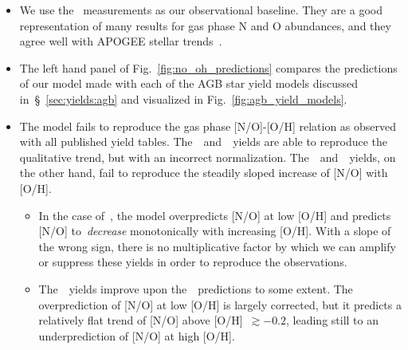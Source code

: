 \documentclass[ms.tex]{subfiles}
\begin{document}
\begin{itemize} 
	\item We use the~\citet{Dopita2016} measurements as our observational 
	baseline. 
	They are a good representation of many results for gas phase N and O 
	abundances, and they agree well with APOGEE stellar 
	trends~\citep{Vincenzo2021}. 

	\item The left hand panel of Fig.~\ref{fig:no_oh_predictions} compares the 
	predictions of our model made with each of the AGB star yield models 
	discussed in~\S~\ref{sec:yields:agb} and visualized in 
	Fig.~\ref{fig:agb_yield_models}. 

	\item The model fails to reproduce the gas phase [N/O]-[O/H] relation as 
	observed with all published yield tables. 
	The~\cristallo~and~\ventura~yields are able to reproduce the qualitative 
	trend, but with an incorrect normalization. 
	The~\karakasten~and~\karakas~yields, on the other hand, fail to reproduce 
	the steadily sloped increase of [N/O] with [O/H]. 
	\begin{itemize} 
		\item In the case of~\karakasten, the model overpredicts [N/O] at low 
		[O/H] and predicts [N/O] to~\textit{decrease} monotonically with 
		increasing [O/H]. 
		With a slope of the wrong sign, there is no multiplicative factor by 
		which we can amplify or suppress these yields in order to reproduce the 
		observations. 

		\item The~\karakas~yields improve upon the~\karakasten~predictions to 
		some extent. 
		The overprediction of [N/O] at low [O/H] is largely corrected, but it 
		predicts a relatively flat trend of [N/O] above [O/H]~$\gtrsim -0.2$, 
		leading still to an underprediction of [N/O] at high [O/H]. 
	\end{itemize} 


\end{itemize}
\end{document}
